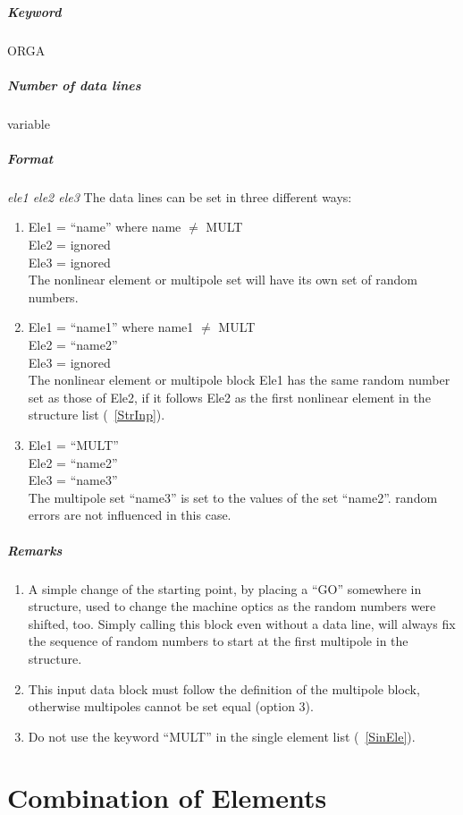 \subparagraph{Keyword} ORGA \subparagraph{Number of data lines}
variable

\subparagraph{Format} {\em ele1 ele2 ele3} \/The data lines can be set
in three different ways:
\begin{enumerate}
\item Ele1 = ``name'' where name $\ne$ MULT \\
  Ele2 = ignored \\
  Ele3 = ignored \\
  The nonlinear element or multipole set will have its own set of
  random numbers.
\item Ele1 = ``name1'' where name1 $\ne$ MULT \\
  Ele2 = ``name2'' \\
  Ele3 = ignored \\
  The nonlinear element or multipole block Ele1 has the same random
  number set as those of Ele2, if it follows Ele2 as the first
  nonlinear element in the structure list (~\ref{StrInp}).
\item Ele1 = ``MULT'' \\
  Ele2 = ``name2'' \\
  Ele3 = ``name3'' \\
  The multipole set ``name3'' is set to the values of the set
  ``name2''. random errors are not influenced in this case.
\end{enumerate}

\subparagraph{Remarks}
\begin{enumerate}
\item A simple change of the starting point, by placing a ``GO''
  somewhere in structure, used to change the machine optics as the
  random numbers were shifted, too.  Simply calling this block even
  without a data line, will always fix the sequence of random numbers
  to start at the first multipole in the structure.
\item This input data block must follow the definition of the
  multipole block, otherwise multipoles cannot be set equal (option
  3).
\item Do not use the keyword ``MULT'' in the single element list
  (~\ref{SinEle}).
\end{enumerate}

\section{Combination of Elements} \label{ComEle}

